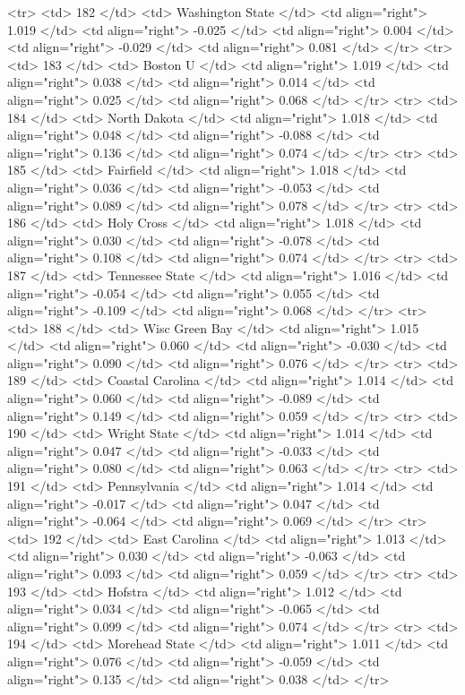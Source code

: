   <tr> <td> 182 </td> <td> Washington State </td> <td align="right"> 1.019 </td> <td align="right"> -0.025 </td> <td align="right"> 0.004 </td> <td align="right"> -0.029 </td> <td align="right"> 0.081 </td> </tr>
  <tr> <td> 183 </td> <td> Boston U </td> <td align="right"> 1.019 </td> <td align="right"> 0.038 </td> <td align="right"> 0.014 </td> <td align="right"> 0.025 </td> <td align="right"> 0.068 </td> </tr>
  <tr> <td> 184 </td> <td> North Dakota </td> <td align="right"> 1.018 </td> <td align="right"> 0.048 </td> <td align="right"> -0.088 </td> <td align="right"> 0.136 </td> <td align="right"> 0.074 </td> </tr>
  <tr> <td> 185 </td> <td> Fairfield </td> <td align="right"> 1.018 </td> <td align="right"> 0.036 </td> <td align="right"> -0.053 </td> <td align="right"> 0.089 </td> <td align="right"> 0.078 </td> </tr>
  <tr> <td> 186 </td> <td> Holy Cross </td> <td align="right"> 1.018 </td> <td align="right"> 0.030 </td> <td align="right"> -0.078 </td> <td align="right"> 0.108 </td> <td align="right"> 0.074 </td> </tr>
  <tr> <td> 187 </td> <td> Tennessee State </td> <td align="right"> 1.016 </td> <td align="right"> -0.054 </td> <td align="right"> 0.055 </td> <td align="right"> -0.109 </td> <td align="right"> 0.068 </td> </tr>
  <tr> <td> 188 </td> <td> Wisc Green Bay </td> <td align="right"> 1.015 </td> <td align="right"> 0.060 </td> <td align="right"> -0.030 </td> <td align="right"> 0.090 </td> <td align="right"> 0.076 </td> </tr>
  <tr> <td> 189 </td> <td> Coastal Carolina </td> <td align="right"> 1.014 </td> <td align="right"> 0.060 </td> <td align="right"> -0.089 </td> <td align="right"> 0.149 </td> <td align="right"> 0.059 </td> </tr>
  <tr> <td> 190 </td> <td> Wright State </td> <td align="right"> 1.014 </td> <td align="right"> 0.047 </td> <td align="right"> -0.033 </td> <td align="right"> 0.080 </td> <td align="right"> 0.063 </td> </tr>
  <tr> <td> 191 </td> <td> Pennsylvania </td> <td align="right"> 1.014 </td> <td align="right"> -0.017 </td> <td align="right"> 0.047 </td> <td align="right"> -0.064 </td> <td align="right"> 0.069 </td> </tr>
  <tr> <td> 192 </td> <td> East Carolina </td> <td align="right"> 1.013 </td> <td align="right"> 0.030 </td> <td align="right"> -0.063 </td> <td align="right"> 0.093 </td> <td align="right"> 0.059 </td> </tr>
  <tr> <td> 193 </td> <td> Hofstra </td> <td align="right"> 1.012 </td> <td align="right"> 0.034 </td> <td align="right"> -0.065 </td> <td align="right"> 0.099 </td> <td align="right"> 0.074 </td> </tr>
  <tr> <td> 194 </td> <td> Morehead State </td> <td align="right"> 1.011 </td> <td align="right"> 0.076 </td> <td align="right"> -0.059 </td> <td align="right"> 0.135 </td> <td align="right"> 0.038 </td> </tr>
